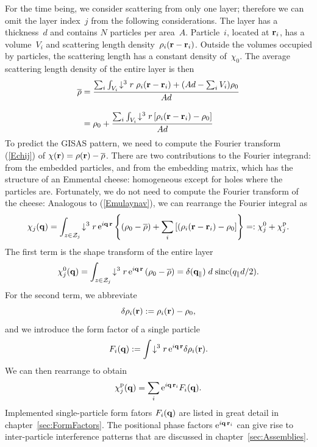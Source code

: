 For the time being,
we consider scattering from only one layer;
therefore we can omit the layer index~$j$ from the following considerations.
The layer has a thickness~$d$ and contains $N$ particles per area~$A$.
Particle~$i$, located at $\mathbf{r}_i$,
has a volume~$V_i$ and scattering length density~$\rho_i(\mathbf{r}-\mathbf{r}_i)$.
Outside the volumes occupied by particles,
the scattering length has a constant density of~$\chi_0$.
The average scattering length density of the entire layer is then
\begin{equation}\label{Emulaynav}
  \begin{split}
  \overline{\rho}
      &= \frac{\sum_i \int_{V_i}\!\downarrow^3r\; \rho_i(\mathbf{r}-\mathbf{r}_i)
               + (Ad-\sum_i V_i)\rho_0}
             {Ad}\\[1em]
      &= \rho_0 + \frac{\sum_i \int_{V_i}\!\downarrow^3r\, [\rho_i(\mathbf{r}-\mathbf{r}_i)-\rho_0]}
             {Ad}
  \end{split}
\end{equation}
To predict the GISAS pattern,
we need to compute the Fourier transform (\ref{Echij}) of
$\chi(\mathbf{r})=\rho(\mathbf{r})-\overline{\rho}$.
There are two contributions to the Fourier integrand:
from the embedded particles, and from the embedding matrix,
which has the structure of an Emmental cheese:
homogeneous except for holes where the particles are.
Fortunately, we do not need to compute the Fourier transform
of the cheese:
Analogous to (\ref{Emulaynav}),
we can rearrange the Fourier integral as
\begin{equation}\label{Echijre}
  \chi_j(\mathbf{q})
  = \int_{z\in\mathcal{Z}_j}\!\downarrow^3r\, \text{e}^{i\mathbf{q}\,\mathbf{r}}
    \left\{ \left(\rho_0-\overline{\rho}\right)
           + \sum_i \left[(\rho_i(\mathbf{r}-\mathbf{r}_i)-\rho_0\right] \right\}
  =: \chi^0_j + \chi^\text{p}_j.
\end{equation}
The first term is the shape transform of the entire layer
\begin{equation}
  \chi^0_j(\mathbf{q})
   = \int_{z\in\mathcal{Z}_j}\!\downarrow^3r\, \text{e}^{i\mathbf{q}\,\mathbf{r}}
      \left(\rho_0-\overline{\rho}\right)
   = \delta(\mathbf{q}_\parallel)\;d\;\text{sinc}(q_\parallel d/2).
\end{equation}
For the second term,
we abbreviate
\begin{equation}
  \delta\rho_i(\mathbf{r}):=\rho_i(\mathbf{r})-\rho_0,
\end{equation}
and we introduce the form factor of a single particle
\begin{equation}
  F_i(\mathbf{q}) := \int\!\downarrow^3r\, \text{e}^{i\mathbf{q}\,\mathbf{r}} \delta\rho_i(\mathbf{r}).
\end{equation}
We can then rearrange to obtain
\begin{equation}
  \chi^\text{p}_j(\mathbf{q})
  = \sum_i \text{e}^{i\mathbf{q}\,\mathbf{r}_i} F_i(\mathbf{q}).
\end{equation}
Implemented single-particle form fators $F_i(\mathbf{q})$
are listed in great detail in chapter~\ref{sec:FormFactors}.
The positional phase factors $\text{e}^{i\mathbf{q}\,\mathbf{r}_i}$
can give rise to inter-particle interference patterns
that are discussed in chapter~\ref{sec:Assemblies}.

